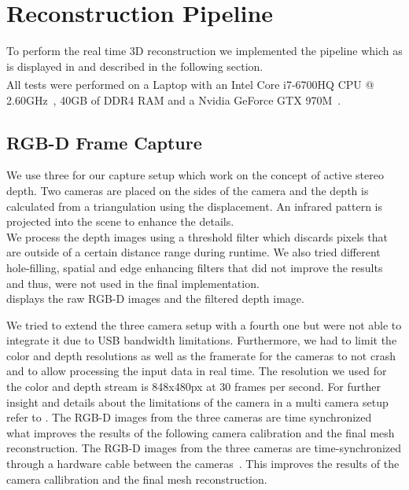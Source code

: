 \documentclass[10pt,twocolumn,letterpaper]{article}
\begin{document}
\section{Reconstruction Pipeline}
\label{sec:reconstruction-pipeline}
To perform the real time 3D reconstruction we implemented the pipeline which as is displayed in  and described in the following section.\\
All tests were performed on a Laptop with an Intel\textsuperscript{\textregistered} Core\texttrademark{} \mbox{i7-6700HQ} CPU @ 2.60GHz~\cite{CPU}, 40GB of DDR4 RAM and a Nvidia GeForce GTX 970M~\cite{GTX970}.

\subsection{RGB-D Frame Capture}
We use three \rscamera{} for our capture setup which work on the concept of active stereo depth. Two cameras are placed on the sides of the camera and the depth is calculated from a triangulation using the displacement. An infrared pattern is projected into the scene to enhance the details.\\
We process the depth images using a threshold filter which discards pixels that are outside of a certain distance range during runtime. We also tried different hole-filling, spatial and edge enhancing filters that did not improve the results and thus, were not used in the final implementation.\\
 displays the raw RGB-D images and the filtered depth image.

We tried to extend the three camera setup with a fourth one but were not able to integrate it due to USB bandwidth limitations. Furthermore, we had to limit the color and depth resolutions as well as the framerate for the cameras to not crash and to allow processing the input data in real time. The resolution we used for the color and depth stream is 848x480px at 30 frames per second. For further insight and details about the limitations of the camera in a multi camera setup refer to \cite{RealSenseWhitepaper}.
\newpage
The RGB-D images from the three cameras are time synchronized~\cite{RealSenseWhitepaper} what improves the results of the following camera calibration and the final mesh reconstruction.
The RGB-D images from the three cameras are time-synchronized through a hardware cable between the cameras~\cite{RealSenseWhitepaper}. This improves the results of the camera callibration and the final mesh reconstruction.
\end{document}
